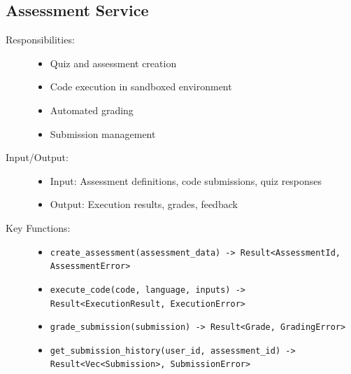 \documentclass[a4paper, 11pt]{scrreprt}
\begin{document}
\subsection{Assessment Service}
\begin{description}
    \item[Responsibilities:]
    \begin{itemize}
        \item Quiz and assessment creation
        \item Code execution in sandboxed environment
        \item Automated grading
        \item Submission management
    \end{itemize}
    
    \item[Input/Output:]
    \begin{itemize}
        \item Input: Assessment definitions, code submissions, quiz responses
        \item Output: Execution results, grades, feedback
    \end{itemize}
    
    \item[Key Functions:]
    \begin{itemize}
        \item \texttt{create\_assessment(assessment\_data) -> Result<AssessmentId, AssessmentError>}
        \item \texttt{execute\_code(code, language, inputs) -> Result<ExecutionResult, ExecutionError>}
        \item \texttt{grade\_submission(submission) -> Result<Grade, GradingError>}
        \item \texttt{get\_submission\_history(user\_id, assessment\_id) -> Result<Vec<Submission>, SubmissionError>}
    \end{itemize}
\end{description}
\end{document}

